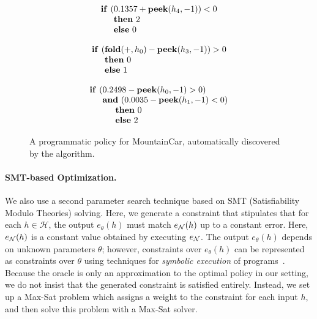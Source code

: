 \begin{figure}[h]
	\begin{equation*}
	\begin{array}{l }
	\mathbf{if}~(0.1357 +\mathbf{peek}(h_4, -1))< 0 \\
	\hspace{15pt}\mathbf{then}~2\\
	\hspace{15pt}\mathbf{else}~0
	\end{array}
	\end{equation*}
	\caption{A programmatic policy for Acrobot, automatically discovered by the \algo algorithm.}
	\label{fig:acro}
	
	\begin{equation*}
	\begin{array}{l }
	\mathbf{if}~(\mathbf{fold}(+, h_0) - \mathbf{peek}(h_3, -1)) > 0  \\
	\hspace{15pt}\mathbf{then}~0\\
	\hspace{15pt}\mathbf{else}~1
	\end{array}
	\end{equation*}
	\caption{A programmatic policy for CartPole, automatically discovered by the \algo algorithm.}
	\label{fig:cpole}
	
	
	\begin{equation*}
	\begin{array}{l }
	\mathbf{if}~(0.2498 - \mathbf{peek}(h_0, -1) > 0 )\\ \hspace{15pt}\mathbf{and}~(0.0035 - \mathbf{peek}(h_1, -1) < 0) \\
	\hspace{30pt}\mathbf{then}~0\\
	\hspace{30pt}\mathbf{else}~2
	\end{array}
	\end{equation*}
	\caption{A programmatic policy for MountainCar, automatically discovered by the \algo algorithm.}
	\label{fig:mcar}
	
	
\end{figure}



\paragraph{SMT-based Optimization.}  
We also use a second parameter search technique based on SMT (Satisfiability Modulo Theories) solving.
Here, we generate a constraint that stipulates that for each $h \in \mathcal{H}$, the output $e_\theta(h)$ must match $e_{\mathcal{N}}(h)$ up to a constant error. Here, $e_{\mathcal{N}}(h)$ is a constant value obtained by executing $e_{\mathcal{N}}$. The output $e_\theta(h)$ depends on unknown parameters $\theta$; however, constraints over $e_\theta(h)$ can be represented as constraints over $\theta$ using techniques for {\em symbolic execution} of programs~\citep{cadar2013symbolic}.
Because the oracle is only an approximation to the optimal policy in our setting, we do not insist that the generated constraint is satisfied entirely. Instead, we 
set up a Max-Sat problem which assigns a weight to the constraint for each input $h$, and then solve this problem with a Max-Sat solver. 

